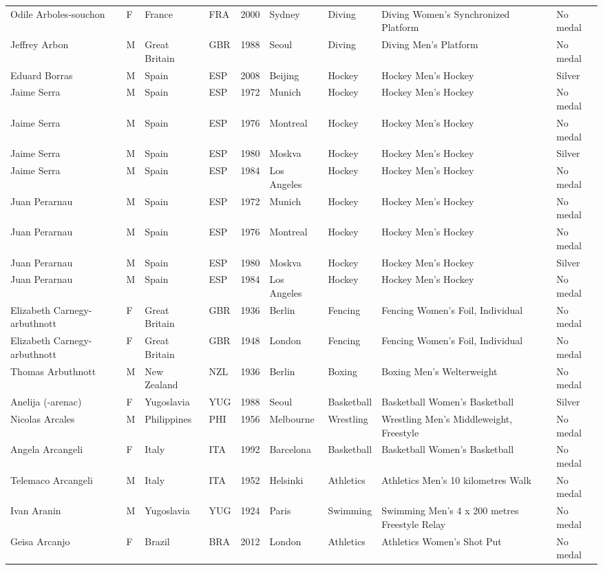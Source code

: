 \documentclass{article}%
\begin{document}
\begin{longtable}{l l l l l l l l l}
Odile Arboles{-}souchon&F&France&FRA&2000&Sydney&Diving&Diving Women's Synchronized Platform&No medal\\%
Jeffrey Arbon&M&Great Britain&GBR&1988&Seoul&Diving&Diving Men's Platform&No medal\\%
Eduard Borras&M&Spain&ESP&2008&Beijing&Hockey&Hockey Men's Hockey&Silver\\%
Jaime Serra&M&Spain&ESP&1972&Munich&Hockey&Hockey Men's Hockey&No medal\\%
Jaime Serra&M&Spain&ESP&1976&Montreal&Hockey&Hockey Men's Hockey&No medal\\%
Jaime Serra&M&Spain&ESP&1980&Moskva&Hockey&Hockey Men's Hockey&Silver\\%
Jaime Serra&M&Spain&ESP&1984&Los Angeles&Hockey&Hockey Men's Hockey&No medal\\%
Juan Perarnau&M&Spain&ESP&1972&Munich&Hockey&Hockey Men's Hockey&No medal\\%
Juan Perarnau&M&Spain&ESP&1976&Montreal&Hockey&Hockey Men's Hockey&No medal\\%
Juan Perarnau&M&Spain&ESP&1980&Moskva&Hockey&Hockey Men's Hockey&Silver\\%
Juan Perarnau&M&Spain&ESP&1984&Los Angeles&Hockey&Hockey Men's Hockey&No medal\\%
Elizabeth Carnegy{-}arbuthnott&F&Great Britain&GBR&1936&Berlin&Fencing&Fencing Women's Foil, Individual&No medal\\%
Elizabeth Carnegy{-}arbuthnott&F&Great Britain&GBR&1948&London&Fencing&Fencing Women's Foil, Individual&No medal\\%
Thomas Arbuthnott&M&New Zealand&NZL&1936&Berlin&Boxing&Boxing Men's Welterweight&No medal\\%
Anelija ({-}arenac)&F&Yugoslavia&YUG&1988&Seoul&Basketball&Basketball Women's Basketball&Silver\\%
Nicolas Arcales&M&Philippines&PHI&1956&Melbourne&Wrestling&Wrestling Men's Middleweight, Freestyle&No medal\\%
Angela Arcangeli&F&Italy&ITA&1992&Barcelona&Basketball&Basketball Women's Basketball&No medal\\%
Telemaco Arcangeli&M&Italy&ITA&1952&Helsinki&Athletics&Athletics Men's 10 kilometres Walk&No medal\\%
Ivan Aranin&M&Yugoslavia&YUG&1924&Paris&Swimming&Swimming Men's 4 x 200 metres Freestyle Relay&No medal\\%
Geisa Arcanjo&F&Brazil&BRA&2012&London&Athletics&Athletics Women's Shot Put&No medal\\%

\end{longtable}
\end{document}
